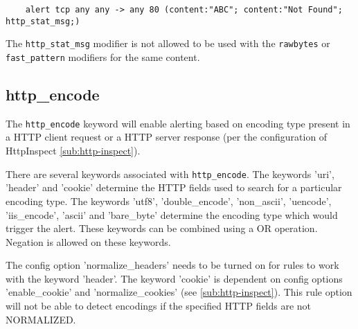 \documentclass[english]{report}
\newenvironment{note}{
\samepage
    \vspace{10pt}{\textsf{
        {\hspace{7pt}\Huge{$\triangle$\hspace{-12.5pt}{\Large{$^!$}}}}\hspace{5pt}
        {\Large{NOTE}}
    }
    }
   \begin{center}
    \par\vspace{-17pt}

    \begin{lrbox}{\savepar}
    \begin{minipage}[r]{6in}
}
{
    \end{minipage}
    \end{lrbox}
    \fbox{
        \usebox{
            \savepar
	}
    }
    \par\vskip10pt
    \end{center}
}
\newenvironment{note}{
        \begin{rawhtml}
        <p><table border="1"><tr><td><b>
        Note:&nbsp;&nbsp;</b>
        \end{rawhtml}
}{
        \begin{rawhtml}
        </b></td></tr></table></p>
        \end{rawhtml}
}
\begin{document}
\begin{verbatim}
    alert tcp any any -> any 80 (content:"ABC"; content:"Not Found"; http_stat_msg;)
\end{verbatim}

\begin{note}

The \texttt{http\_stat\_msg} modifier is not allowed to be used with the
\texttt{rawbytes} or \texttt{fast\_pattern} modifiers for the same content.

\end{note}

\subsection{http\_encode}
\label{sub:HttpEncode}

The \texttt{http\_encode} keyword will enable alerting based on encoding type present
in a HTTP client request or a HTTP server response (per the configuration of 
HttpInspect \ref{sub:http-inspect}).

There are several keywords associated with \texttt{http\_encode}. The keywords
'uri', 'header' and 'cookie' determine the HTTP fields used to search for a
particular encoding type.  The keywords 'utf8', 'double\_encode', 'non\_ascii',
'uencode', 'iis\_encode', 'ascii' and 'bare\_byte' determine the encoding 
type which would trigger the alert. These keywords can be combined using a OR operation.
Negation is allowed on these keywords.

The config option 'normalize\_headers' needs to be turned on for rules to work
with the keyword 'header'.  The keyword 'cookie' is dependent on config options
'enable\_cookie' and 'normalize\_cookies' (see \ref{sub:http-inspect}).  This
rule option will not be able to detect encodings if the specified HTTP fields
are not NORMALIZED.
\end{document}
